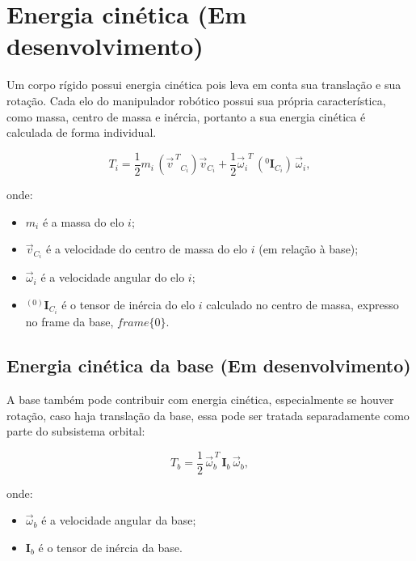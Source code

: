 \section{Energia cinética (Em desenvolvimento)}
Um corpo rígido possui energia cinética pois leva em conta sua translação e sua rotação. Cada elo do manipulador robótico possui sua própria característica, como massa, centro de massa e inércia, portanto a sua energia cinética é calculada de forma individual.

\begin{equation}
T_i =
\frac{1}{2} m_i \,
({{\vec v}^{\, T}}_{C_i}) \vec{v}_{C_i}
+ \frac{1}{2} {\vec \omega_i}^{T} \, ({}^{0} \mathbf{I}_{C_i}) \, \vec{\omega}_i,
\end{equation}

onde:
\begin{itemize}
    \item $m_i$ é a massa do elo $i$;
    \item $\vec{v}_{C_i}$ é a velocidade do centro de massa do elo $i$ (em relação à base);
    \item $\vec{\omega}_i$ é a velocidade angular do elo $i$;
    \item ${}^{(0)} \mathbf{I}_{C_i}$ é o tensor de inércia do elo $i$ calculado no centro de massa, expresso no frame da base, $frame \{0\}$.
\end{itemize}

\subsection{Energia cinética da base (Em desenvolvimento)}
A base também pode contribuir com energia cinética, especialmente se houver rotação, caso haja translação da base, essa pode ser tratada separadamente como parte do subsistema orbital:

\begin{equation}
T_b = \frac{1}{2} \, \vec{\omega}_b^{\,T} \, \mathbf{I}_b \, \vec{\omega}_b,
\end{equation}

onde:
\begin{itemize}
    \item $\vec{\omega}_b$ é a velocidade angular da base;
    \item $\mathbf{I}_b$ é o tensor de inércia da base.
\end{itemize}

